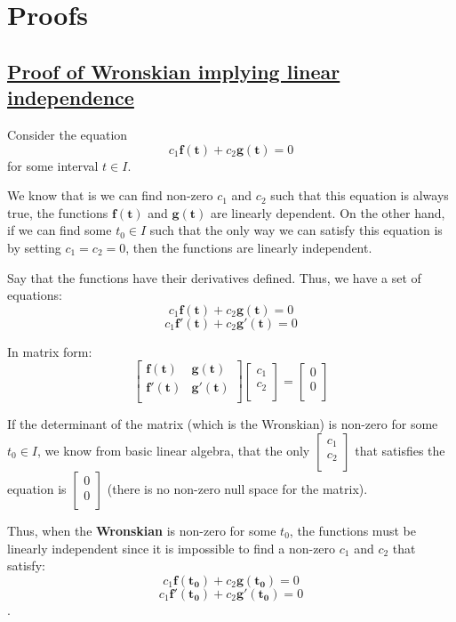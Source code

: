 \documentclass{report}
\begin{document}
\chapter{Proofs}
\section{\hyperref[th:wronLinInd]{Proof of Wronskian implying linear independence}}
\label{sec:prWronLinInd}
Consider the equation 
$$c_1\bm{f(t)} + c_2\bm{g(t)} = 0$$ 
for some interval $t \in I$. 

We know that is we can find non-zero $c_1$ and $c_2$ such that this equation is always true, the functions $\bm{f(t)}$ and $\bm{g(t)}$ are linearly dependent. On the other hand, if we can find some $t_0 \in I$ such that the only way we can satisfy this equation is by setting $c_1 = c_2 = 0$, then the functions are linearly independent.

Say that the functions have their derivatives defined. Thus, we have a set of equations:
$$c_1\bm{f(t)} + c_2\bm{g(t)} = 0$$ 
$$c_1\bm{f'(t)} + c_2\bm{g'(t)} = 0$$ 

In matrix form:
$$
\begin{bmatrix}
    \bm{f(t)} & \bm{g(t)} \\
    \bm{f'(t)} & \bm{g'(t)} \\
\end{bmatrix}
\begin{bmatrix}
    c_1 \\
    c_2 \\
\end{bmatrix}
=
\begin{bmatrix}
    0 \\
    0 \\
\end{bmatrix}
$$

If the determinant of the matrix (which is the Wronskian) is non-zero for some $t_0 \in I$, we know from basic linear algebra, that the only $\begin{bmatrix}
    c_1 \\
    c_2 \\
\end{bmatrix}$ that satisfies the equation is $\begin{bmatrix}
    0 \\
    0 \\
\end{bmatrix}$ (there is no non-zero null space for the matrix).

Thus, when the \textbf{Wronskian} is non-zero for some $t_0$, the functions must be linearly independent since it is impossible to find a non-zero $c_1$ and $c_2$ that satisfy:
$$c_1\bm{f(t_0)} + c_2\bm{g(t_0)} = 0$$
$$c_1\bm{f'(t_0)} + c_2\bm{g'(t_0)} = 0$$.
\end{document}
